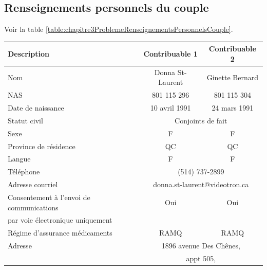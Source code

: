 \subsection{Renseignements personnels du couple}
Voir la table \ref{table:chapitre3ProblemeRenseignementsPersonnelsCouple}.
\begin{table}
	\centering
	\begin{tabular}{|l|c|c|}
		\hline
		\rowcolor{LightGreen} \textbf{Description} & \textbf{Contribuable 1} & \textbf{Contribuable 2}  \\ \hline
		Nom                                        &    Donna St-Laurent     &     Ginette Bernard      \\ \hline
		NAS                                        &       801 115 296       &       801 115 304        \\ \hline
		Date de naissance                          &      10 avril 1991      &       24 mars 1991       \\ \hline
		Statut civil                               &       \multicolumn{2}{c|}{Conjoints de fait}       \\ \hline
		Sexe                                       &            F            &            F             \\ \hline
		Province de résidence                      &           QC            &            QC            \\ \hline
		Langue                                     &            F            &            F             \\ \hline
		Téléphone                                  &        \multicolumn{2}{c|}{(514) 737-2899}         \\ \hline
		Adresse courriel                           & \multicolumn{2}{c|}{donna.st-laurent@videotron.ca} \\ \hline
		Consentement à l'envoi de communications   &           Oui           &           Oui            \\
		par voie électronique uniquement           &                         &                          \\ \hline
		Régime d'assurance médicaments             &          RAMQ           &           RAMQ           \\ \hline
		Adresse                                    &    \multicolumn{2}{c|}{1896 avenue Des Chênes,}    \\
		                                           &           \multicolumn{2}{c|}{appt 505,}           \\

\end{tabular}
\end{table}
